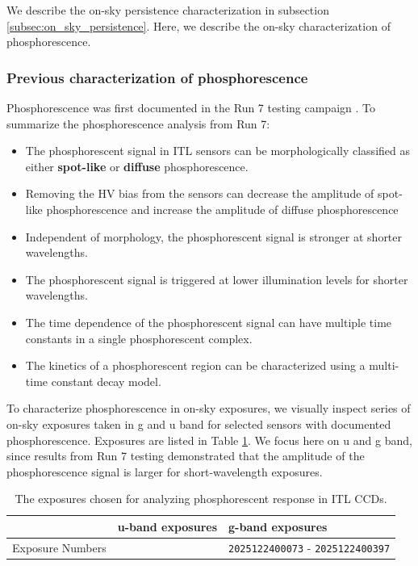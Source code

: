 We describe the on-sky persistence characterization in subsection \ref{subsec:on_sky_persistence}. Here, we describe the on-sky characterization of phosphorescence.

\subsubsection{Previous characterization of phosphorescence}

Phosphorescence was first documented in the Run 7 testing campaign \citep{SITCOMTN-148}. To summarize the phosphorescence analysis from Run 7:

\begin{itemize}
    \item The phosphorescent signal in ITL sensors can be morphologically classified as either \textbf{spot-like} or \textbf{diffuse} phosphorescence. 
    \item Removing the HV bias from the sensors can decrease the amplitude of spot-like phosphorescence and increase the amplitude of diffuse phosphorescence 
    \item Independent of morphology, the phosphorescent signal is stronger at shorter wavelengths. 
    \item The phosphorescent signal is triggered at lower illumination levels for shorter wavelengths. 
    \item The time dependence of the phosphorescent signal can have multiple time constants in a single phosphorescent complex.
    \item The kinetics of a phosphorescent region can be characterized using a multi-time constant decay model. 
\end{itemize}

To characterize phosphorescence in on-sky exposures, we visually inspect series of on-sky exposures taken in g and u band for selected sensors with documented phosphorescence. Exposures are listed in Table \ref{tab:phosphorescent_exposures}. We focus here on u and g band, since results from Run 7 testing demonstrated that the amplitude of the phosphorescence signal is larger for short-wavelength exposures.

\begin{table}[]
\centering
\begin{tabular}{|c|p{6cm}|p{6cm}|}
\hline
                 & u-band exposures & g-band exposures \\ \hline \hline 
Exposure Numbers &                  & \texttt{2025122400073} - \texttt{2025122400397}                \\  \hline
\end{tabular}
\caption{The exposures chosen for analyzing phosphorescent response in ITL CCDs.}
\label{tab:phosphorescent_exposures}
\end{table}

